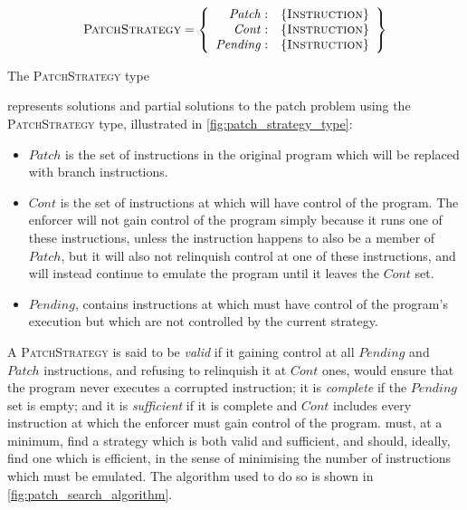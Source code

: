 \begin{sanefig}
  \begin{displaymath}
    \textsc{PatchStrategy} = \left\{\begin{array}{rl}
    \mathit{Patch}: & \{\textsc{Instruction}\} \\
    \mathit{Cont}: & \{\textsc{Instruction}\} \\
    \mathit{Pending}: & \{\textsc{Instruction}\}
    \end{array}\right\}
  \end{displaymath}
  \vspace{-12pt}
  \caption{The \textsc{PatchStrategy} type}
  \label{fig:patch_strategy_type}
\end{sanefig}

{\Implementation} represents solutions and partial solutions to the
patch problem using the \textsc{PatchStrategy} type, illustrated in
\autoref{fig:patch_strategy_type}:
\begin{itemize}
\item $\mathit{Patch}$ is the set of instructions in the original
  program which will be replaced with branch instructions.
\item $\mathit{Cont}$ is the set of instructions at which
  {\implementation} will have control of the program.  The enforcer
  will not gain control of the program simply because it runs one of
  these instructions, unless the instruction happens to also be a
  member of $\mathit{Patch}$, but it will also not relinquish control
  at one of these instructions, and will instead continue to emulate
  the program until it leaves the $\mathit{Cont}$ set.
\item $\mathit{Pending}$, contains instructions at which
  {\implementation} must have control of the program's execution but
  which are not controlled by the current strategy.
\end{itemize}
A \textsc{PatchStrategy} is said to be \emph{valid} if it gaining
control at all $\mathit{Pending}$ and $\mathit{Patch}$ instructions,
and refusing to relinquish it at $\mathit{Cont}$ ones, would ensure
that the program never executes a corrupted instruction; it is
\emph{complete} if the $\mathit{Pending}$ set is empty; and it is
\emph{sufficient} if it is complete and $\mathit{Cont}$ includes every
instruction at which the enforcer must gain control of the program.
{\Implementation} must, at a minimum, find a strategy which is both
valid and sufficient, and should, ideally, find one which is
efficient, in the sense of minimising the number of instructions which
must be emulated.  The algorithm used to do so is shown in
\autoref{fig:patch_search_algorithm}.

